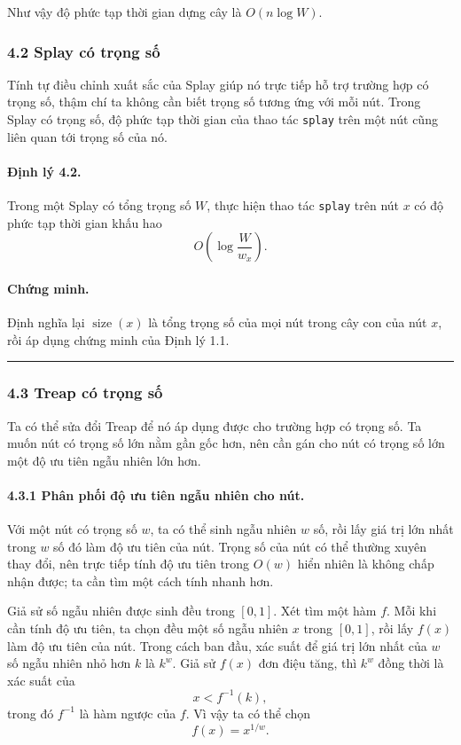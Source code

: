 \documentclass[11pt]{article}
\newcommand{\qedmark}{\hfill\rule{0.7ex}{0.7ex}}
\begin{document}
Như vậy độ phức tạp thời gian dựng cây là \(O(n\log W)\).

\subsubsection*{4.2 Splay có trọng số}

Tính tự điều chỉnh xuất sắc của Splay giúp nó trực tiếp hỗ trợ trường hợp có
trọng số, thậm chí ta không cần biết trọng số tương ứng với mỗi nút. Trong
Splay có trọng số, độ phức tạp thời gian của thao tác \texttt{splay} trên một
nút cũng liên quan tới trọng số của nó.

\paragraph{Định lý 4.2.}
Trong một Splay có tổng trọng số \(W\), thực hiện thao tác \texttt{splay} trên
nút \(x\) có độ phức tạp thời gian khấu hao
\[
  O\left(\log\frac{W}{w_x}\right).
\]

\paragraph{Chứng minh.}
Định nghĩa lại \(\operatorname{size}(x)\) là tổng trọng số của mọi nút trong cây
con của nút \(x\), rồi áp dụng chứng minh của Định lý 1.1. \qedmark

\subsubsection*{4.3 Treap có trọng số}

Ta có thể sửa đổi Treap để nó áp dụng được cho trường hợp có trọng số. Ta muốn
nút có trọng số lớn nằm gần gốc hơn, nên cần gán cho nút có trọng số lớn một độ
ưu tiên ngẫu nhiên lớn hơn.

\paragraph{4.3.1 Phân phối độ ưu tiên ngẫu nhiên cho nút.}
Với một nút có trọng số \(w\), ta có thể sinh ngẫu nhiên \(w\) số, rồi lấy giá
trị lớn nhất trong \(w\) số đó làm độ ưu tiên của nút. Trọng số của nút có thể
thường xuyên thay đổi, nên trực tiếp tính độ ưu tiên trong \(O(w)\) hiển nhiên
là không chấp nhận được; ta cần tìm một cách tính nhanh hơn.

Giả sử số ngẫu nhiên được sinh đều trong \([0,1]\). Xét tìm một hàm \(f\). Mỗi
khi cần tính độ ưu tiên, ta chọn đều một số ngẫu nhiên \(x\) trong \([0,1]\),
rồi lấy \(f(x)\) làm độ ưu tiên của nút. Trong cách ban đầu, xác suất để giá
trị lớn nhất của \(w\) số ngẫu nhiên nhỏ hơn \(k\) là \(k^w\). Giả sử \(f(x)\)
đơn điệu tăng, thì \(k^w\) đồng thời là xác suất của
\[
  x<f^{-1}(k),
\]
trong đó \(f^{-1}\) là hàm ngược của \(f\). Vì vậy ta có thể chọn
\[
  f(x)=x^{1/w}.
\]
\end{document}

